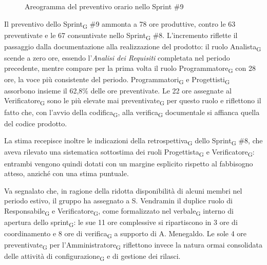 ﻿\documentclass[a4paper, 10pt, colorlinks=true, linkcolor=black, urlcolor=blue, citecolor=blue, hidelinks]{article}
\begin{document}
\begin{figure}[H]

\caption{Areogramma del preventivo orario nello Sprint \#9}
\label{fig:preventivo-sprint9}
\end{figure}

Il preventivo dello Sprint\textsubscript{G} \#9 ammonta a 78 ore produttive, contro le 63 preventivate e le 67 consuntivate nello Sprint\textsubscript{G} \#8. L'incremento riflette il passaggio dalla documentazione alla realizzazione del prodotto: il ruolo Analista\textsubscript{G} scende a zero ore, essendo l'\textit{Analisi dei Requisiti} completata nel periodo precedente, mentre compare per la prima volta il ruolo Programmatore\textsubscript{G} con 28 ore, la voce più consistente del periodo. Programmatori\textsubscript{G} e Progettisti\textsubscript{G} assorbono insieme il 62,8\% delle ore preventivate. Le 22 ore assegnate al Verificatore\textsubscript{G} sono le più elevate mai preventivate\textsubscript{G} per questo ruolo e riflettono il fatto che, con l'avvio della codifica\textsubscript{G}, alla verifica\textsubscript{G} documentale si affianca quella del codice prodotto.

La stima recepisce inoltre le indicazioni della retrospettiva\textsubscript{G} dello Sprint\textsubscript{G} \#8, che aveva rilevato una sistematica sottostima dei ruoli Progettista\textsubscript{G} e Verificatore\textsubscript{G}: entrambi vengono quindi dotati con un margine esplicito rispetto al fabbisogno atteso, anziché con una stima puntuale.

Va segnalato che, in ragione della ridotta disponibilità di alcuni membri nel periodo estivo, il gruppo ha assegnato a S. Vendramin il duplice ruolo di Responsabile\textsubscript{G} e Verificatore\textsubscript{G}, come formalizzato nel verbale\textsubscript{G} interno di apertura dello sprint\textsubscript{G}: le sue 11 ore complessive si ripartiscono in 3 ore di coordinamento e 8 ore di verifica\textsubscript{G} a supporto di A. Menegaldo. Le sole 4 ore preventivate\textsubscript{G} per l'Amministratore\textsubscript{G} riflettono invece la natura ormai consolidata delle attività di configurazione\textsubscript{G} e di gestione dei rilasci.
\end{document}
